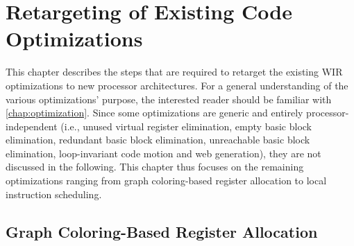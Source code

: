 \chapter{Retargeting of Existing Code Optimizations}
\label{chap:optretarget}
\renewcommand{\sectiontitle}{}

This chapter describes the steps that are required to retarget the existing \gls{WIR} optimizations to new processor architectures.
For a general understanding of the various optimizations' purpose, the interested reader should be familiar with \cref{chap:optimization}.
Since some optimizations are generic and entirely processor-independent (i.e., unused virtual register elimination, empty basic block elimination, redundant basic block elimination, unreachable basic block elimination, loop-invariant code motion and web generation), they are not discussed in the following.
This chapter thus focuses on the remaining optimizations ranging from graph coloring-based register allocation to local instruction scheduling.


\section{Graph Coloring-Based Register Allocation}
\label{sec:optregallocretarget}

